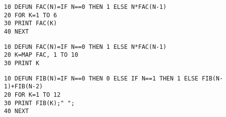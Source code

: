 \begin{lstlisting}
10 DEFUN FAC(N)=IF N==0 THEN 1 ELSE N*FAC(N-1)
20 FOR K=1 TO 6
30 PRINT FAC(K)
40 NEXT
\end{lstlisting}

\begin{lstlisting}
10 DEFUN FAC(N)=IF N==0 THEN 1 ELSE N*FAC(N-1)
20 K=MAP FAC, 1 TO 10
30 PRINT K
\end{lstlisting}

\begin{lstlisting}
10 DEFUN FIB(N)=IF N==0 THEN 0 ELSE IF N==1 THEN 1 ELSE FIB(N-1)+FIB(N-2)
20 FOR K=1 TO 12
30 PRINT FIB(K);" ";
40 NEXT
\end{lstlisting}
